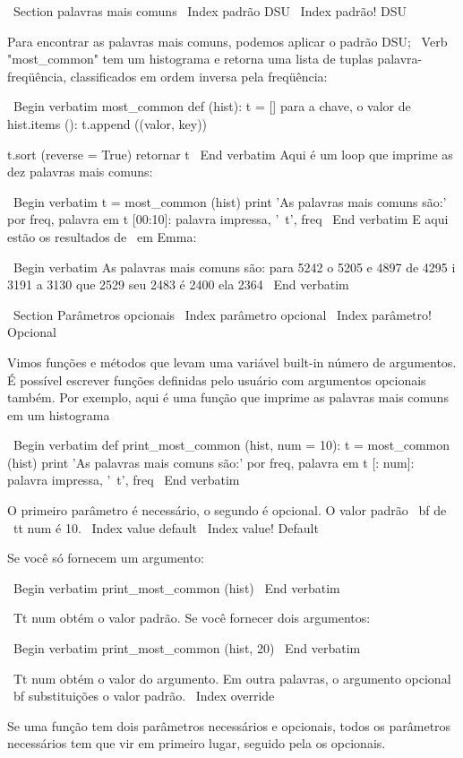 \documentclass[10pt]{book}
\begin{document}
\begin {itemize}
{{{{{{{{{\ Section {palavras mais comuns}
\ Index {padrão DSU}
\ Index {padrão! DSU}

Para encontrar as palavras mais comuns, podemos aplicar o padrão DSU;
\ Verb "most_common" tem um histograma e retorna uma lista de
tuplas palavra-freqüência, classificados em ordem inversa pela freqüência:

\ Begin {verbatim}
most_common def (hist):
    t = []
    para a chave, o valor de hist.items ():
        t.append ((valor, key))

    t.sort (reverse = True)
    retornar t
\ End {verbatim}
%
Aqui é um loop que imprime as dez palavras mais comuns:

\ Begin {verbatim}
t = most_common (hist)
print 'As palavras mais comuns são:'
por freq, palavra em t [00:10]:
    palavra impressa, '\ t', freq
\ End {verbatim}
%
E aqui estão os resultados de {\ em Emma}:

\ Begin {verbatim}
As palavras mais comuns são:
para 5242
o 5205
e 4897
de 4295
i 3191
a 3130
que 2529
seu 2483
é 2400
ela 2364
\ End {verbatim}
%

\ Section {Parâmetros opcionais}
\ Index {parâmetro opcional}
\ Index {parâmetro! Opcional}

Vimos funções e métodos que levam uma variável built-in
número de argumentos. É possível escrever funções definidas pelo usuário
com argumentos opcionais também. Por exemplo, aqui é uma função que
imprime as palavras mais comuns em um histograma

\ Begin {verbatim}
def print_most_common (hist, num = 10):
    t = most_common (hist)
    print 'As palavras mais comuns são:'
    por freq, palavra em t [: num]:
        palavra impressa, '\ t', freq
\ End {verbatim}

O primeiro parâmetro é necessário, o segundo é opcional.
O valor padrão {\ bf} de {\ tt num} é 10.
\ Index {value default}
\ Index {value! Default}

Se você só fornecem um argumento:

\ Begin {verbatim}
print_most_common (hist)
\ End {verbatim}

{\ Tt num} obtém o valor padrão. Se você fornecer dois argumentos:

\ Begin {verbatim}
print_most_common (hist, 20)
\ End {verbatim}

{\ Tt num} obtém o valor do argumento. Em outra
palavras, o argumento opcional {\ bf substituições} o valor padrão.
\ Index {override}

Se uma função tem dois parâmetros necessários e opcionais, todos
os parâmetros necessários tem que vir em primeiro lugar, seguido pela
os opcionais.


}}}}}}}}}
\end{itemize}
\end{document}
